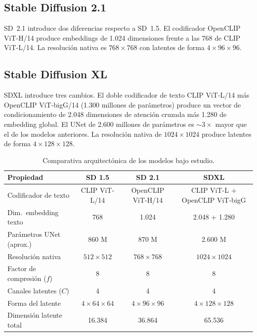 \documentclass[12pt, a4paper, twoside]{book}
\begin{document}
\subsection{Stable Diffusion 2.1}

SD~2.1 \citep{stabilityai2022sd2} introduce dos diferencias respecto a SD~1.5. El codificador OpenCLIP ViT-H/14 \citep{ilharco2021openclip} produce embeddings de 1.024 dimensiones frente a las 768 de CLIP ViT-L/14. La resolución nativa es $768 \times 768$ con latentes de forma $4 \times 96 \times 96$.

\subsection{Stable Diffusion XL}

SDXL \citep{podell2023sdxl} introduce tres cambios. El doble codificador de texto CLIP ViT-L/14 más OpenCLIP ViT-bigG/14 (1.300 millones de parámetros) produce un vector de condicionamiento de 2.048 dimensiones de atención cruzada más 1.280 de embedding global. El UNet de 2.600 millones de parámetros es $\sim 3\times$ mayor que el de los modelos anteriores. La resolución nativa de $1024 \times 1024$ produce latentes de forma $4 \times 128 \times 128$.

\begin{table}[htb]
\centering
\caption{Comparativa arquitectónica de los modelos bajo estudio.}
\label{tab:arquitecturas}
\small
\begin{tabular}{lccc}
\toprule
\textbf{Propiedad} & \textbf{SD 1.5} & \textbf{SD 2.1} & \textbf{SDXL} \\
\midrule
Codificador de texto & CLIP ViT-L/14 & OpenCLIP ViT-H/14 & CLIP ViT-L + OpenCLIP ViT-bigG \\
Dim.\ embedding texto & 768 & 1.024 & 2.048 + 1.280 \\
Parámetros UNet (aprox.) & 860 M & 870 M & 2.600 M \\
Resolución nativa & $512\times512$ & $768\times768$ & $1024\times1024$ \\
Factor de compresión ($f$) & 8 & 8 & 8 \\
Canales latentes ($C$) & 4 & 4 & 4 \\
Forma del latente & $4\times64\times64$ & $4\times96\times96$ & $4\times128\times128$ \\
Dimensión latente total & 16.384 & 36.864 & 65.536 \\
\bottomrule
\end{tabular}
\end{table}
\end{document}

